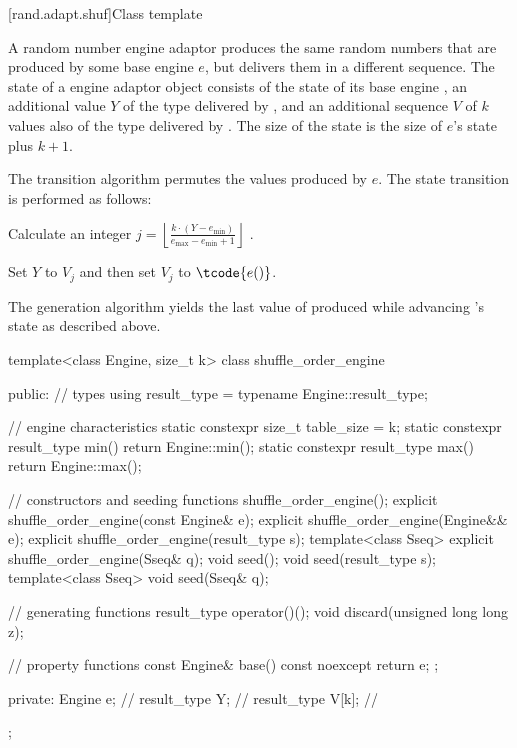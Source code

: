 [rand.adapt.shuf]{Class template }%
%

\pnum
A  random number engine adaptor
produces the same random numbers
that are produced by some base engine $e$,
but delivers them in a different sequence.
The state%
%
of a  engine adaptor object 
consists of
 the state  of its base engine ,
 an additional value $Y$ of the type delivered by ,
and
 an additional sequence $V$ of $k$ values
 also of the type delivered by .
The size of the state is
 the size of $e$'s state plus $k+1$.

\pnum
The transition algorithm%
%
permutes the values produced by $e$.
The state transition is performed as follows:
\begin{enumeratea}
 \item
   Calculate an integer
   $j = \left\lfloor \frac{k \cdot (Y - e_{\min})}
                          {e_{\max} - e_{\min} +1}
        \right\rfloor
   $%
   .
 \item
   Set $Y$ to $V_j$ and then set $V_j$ to $\tcode{e()}$.
\end{enumeratea}

\pnum
The generation algorithm%
%
yields the last value of 
 produced while advancing 's state as described above.

%
\begin{codeblock}
template<class Engine, size_t k>
 class shuffle_order_engine
{
public:
 // types
 using result_type = typename Engine::result_type;

 // engine characteristics
 static constexpr size_t table_size = k;
 static constexpr result_type min() { return Engine::min(); }
 static constexpr result_type max() { return Engine::max(); }

 // constructors and seeding functions
 shuffle_order_engine();
 explicit shuffle_order_engine(const Engine& e);
 explicit shuffle_order_engine(Engine&& e);
 explicit shuffle_order_engine(result_type s);
 template<class Sseq> explicit shuffle_order_engine(Sseq& q);
 void seed();
 void seed(result_type s);
 template<class Sseq> void seed(Sseq& q);

 // generating functions
 result_type operator()();
 void discard(unsigned long long z);

 // property functions
 const Engine& base() const noexcept { return e; };

private:
 Engine e;           // \expos
 result_type Y;      // \expos
 result_type V[k];   // \expos
};
\end{codeblock}

